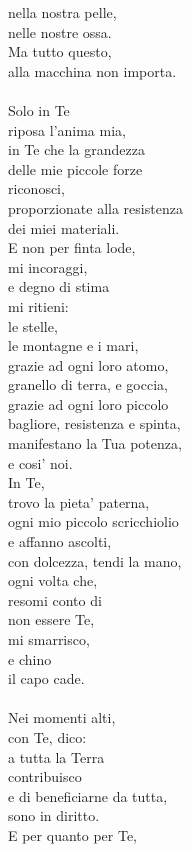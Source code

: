 \begin{haiku}
nella nostra pelle,\\
nelle nostre ossa.\\
Ma tutto questo,\\
alla macchina non importa.\\
\leavevmode\\
Solo in Te\\
riposa l'anima mia,\\
in Te che la grandezza\\
delle mie piccole forze\\
riconosci,\\
proporzionate alla resistenza\\
dei miei materiali.\\
E non per finta lode,\\
mi incoraggi,\\
e degno di stima\\
mi ritieni:\\
le stelle, \\
le montagne e i mari,\\
grazie ad ogni loro atomo,\\
granello di terra, e goccia,\\
grazie ad ogni loro piccolo\\
bagliore, resistenza e spinta,\\
manifestano la Tua potenza,\\
e cosi' noi.\\
In Te,\\
trovo la pieta' paterna,\\
ogni mio piccolo scricchiolio\\
e affanno ascolti,\\
con dolcezza, tendi la mano,\\
ogni volta che,\\
resomi conto di \\
non essere Te,\\
mi smarrisco,\\
e chino\\
il capo cade.\\
\leavevmode\\
Nei momenti alti,\\
con Te, dico:\\
a tutta la Terra\\
contribuisco\\
e di beneficiarne da tutta,\\
sono in diritto.\\
E per quanto per Te,\\

\end{haiku}
